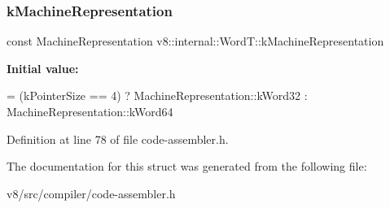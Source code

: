 \subsubsection{\texorpdfstring{k\+Machine\+Representation}{kMachineRepresentation}}
{\footnotesize\ttfamily const Machine\+Representation v8\+::internal\+::\+Word\+T\+::k\+Machine\+Representation\hspace{0.3cm}{\ttfamily [static]}}

{\bfseries Initial value\+:}
\begin{DoxyCode}
=
      (kPointerSize == 4) ? MachineRepresentation::kWord32
                          : MachineRepresentation::kWord64
\end{DoxyCode}


Definition at line 78 of file code-\/assembler.\+h.



The documentation for this struct was generated from the following file\+:\begin{DoxyCompactItemize}
\item 
v8/src/compiler/code-\/assembler.\+h\end{DoxyCompactItemize}
